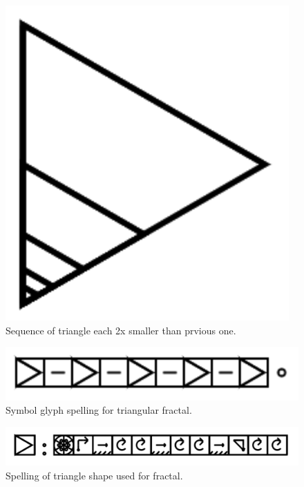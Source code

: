 \documentclass[11pt]{book}
\begin{document}
\begin{figure}

\includegraphics[width=\linewidth]{../figures/trianglefractal1.png}

\caption{Sequence of triangle each 2x smaller than prvious one.}
\end{figure}


\begin{figure}

\includegraphics[width=\linewidth]{../figures/triangle1fractalspell.png}

\caption{Symbol glyph spelling for triangular fractal.}
\end{figure}


\begin{figure}

\includegraphics[width=\linewidth]{../figures/spelltriangleshape.png}

\caption{Spelling of triangle shape used for fractal.}
\end{figure}
\end{document}
